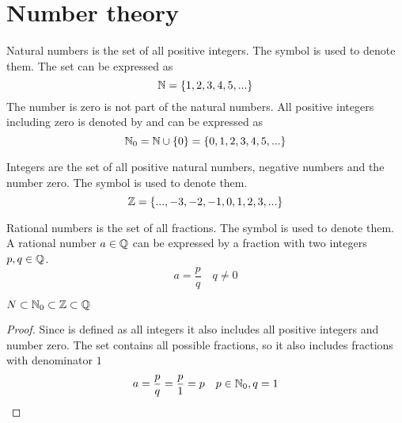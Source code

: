 \chapter{Number theory}

\begin{definition}
    Natural numbers is the set of all positive integers.
    The symbol \N{} is used to denote them.
    The set can be expressed as
    \begin{equation}
        \mathbb{N} = \{1,2,3,4,5,... \}
    \end{equation}
    The number is zero is not part of the natural numbers.
    All positive integers including zero is denoted by \Nzero{} and can be expressed as
    \begin{equation}
        \mathbb{N}_0 = \mathbb{N} \cup \{0\} = \{0, 1,2,3,4,5,... \}
    \end{equation}
\end{definition}

\begin{definition}[Integers]
    Integers are the set of all positive natural numbers, negative numbers and the number zero.
    The symbol \Z{} is used to denote them.
    \begin{equation}
        \mathbb{Z} = \{...,-3,-2,-1,0,1,2,3,... \}
    \end{equation}
\end{definition}

\begin{definition}
    Rational numbers is the set of all fractions.
    The symbol \Q{} is used to denote them.
    A rational number $a \in \mathbb{Q}$ can be expressed by a fraction with 
    two integers $p,q \in \mathbb{Q}$.
    \begin{equation}
        a = \frac{p}{q} \quad q \ne 0
    \end{equation}
\end{definition}

\begin{lemma}
    $N \subset \mathbb{N}_0 \subset \mathbb{Z} \subset \mathbb{Q}$
\end{lemma}
\begin{proof}
    Since \Z{} is defined as all integers it also includes all positive integers \N{} and 
    number zero.
    The set \Q{} contains all possible fractions, so it also includes fractions with denominator $1$
    \begin{equation}
        a = \frac{p}{q} = \frac{p}{1} = p \quad p \in \mathbb{N}_0, q = 1
    \end{equation}
\end{proof}

